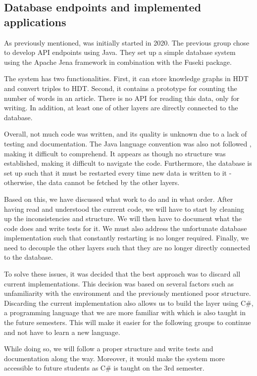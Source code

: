 \subsection{Database endpoints and implemented applications}

As previously mentioned, \knox{} was initially started in 2020.
The previous group chose to develop API endpoints using Java.
They set up a simple database system using the Apache Jena framework in combination with the Fuseki package.

The system has two functionalities. 
First, it can store knowledge graphs in HDT and convert triples to HDT.
Second, it contains a prototype for counting the number of words in an article.
There is no API for reading this data, only for writing. 
In addition, at least one of other layers are directly connected to the database.

Overall, not much code was written, and its quality is unknown due to a lack of testing and documentation.
The Java language convention was also not followed \cite{java_convention}, making it difficult to comprehend.
It appears as though no structure was established, making it difficult to navigate the code. 
Furthermore, the database is set up such that it must be restarted every time new data is written to it - otherwise, the data cannot be fetched by the other layers.

Based on this, we have discussed what work to do and in what order.
After having read and understood the current code, we will have to start by cleaning up the inconsistencies and structure.
We will then have to document what the code does and write tests for it.
We must also address the unfortunate database implementation such that constantly restarting is no longer required.
Finally, we need to decouple the other layers such that they are no longer directly connected to the database.

To solve these issues, it was decided that the best approach was to discard all current implementations. 
This decision was based on several factors such as unfamiliarity with the environment and the previously mentioned poor structure. 
Discarding the current implementation also allows us to build the layer using C\#, a programming language that we are more familiar with which is also taught in the future semesters. 
This will make it easier for the following groups to continue and not have to learn a new language.

While doing so, we will follow a proper structure and write tests and documentation along the way. 
Moreover, it would make the system more accessible to future students as C\# is taught on the 3rd semester.